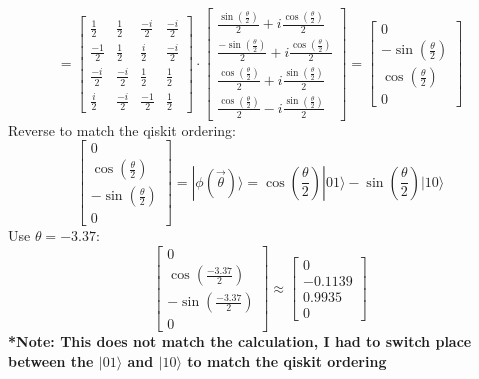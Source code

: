 \documentclass{article}
\begin{document}
\begin{equation}
	\label{eq:1}
	=
	\begin{bmatrix}
		\frac{1}{2}  & \frac{1}{2}  & \frac{-i}{2} & \frac{-i}{2} \\
		\frac{-1}{2} & \frac{1}{2}  & \frac{i}{2}  & \frac{-i}{2} \\
		\frac{-i}{2} & \frac{-i}{2} & \frac{1}{2}  & \frac{1}{2}  \\
		\frac{i}{2}  & \frac{-i}{2} & \frac{-1}{2} & \frac{1}{2}
	\end{bmatrix}
	\cdot
	\begin{bmatrix}
		\frac{\sin \left(\frac{\theta}{2}\right)}{2} + i \frac{\cos \left(\frac{\theta}{2}\right)}{2}  \\
		\frac{-\sin \left(\frac{\theta}{2}\right)}{2} + i \frac{\cos \left(\frac{\theta}{2}\right)}{2} \\
		\frac{\cos \left(\frac{\theta}{2}\right)}{2} + i \frac{\sin \left(\frac{\theta}{2}\right)}{2}  \\
		\frac{\cos \left(\frac{\theta}{2}\right)}{2} - i \frac{\sin \left(\frac{\theta}{2}\right)}{2}
	\end{bmatrix}
	=\begin{bmatrix}
		0                        \\
		- \sin(\frac{\theta}{2}) \\
		\cos(\frac{\theta}{2})   \\
		0
	\end{bmatrix}
\end{equation}
Reverse to match the qiskit ordering:
\begin{equation}
	\label{eq:ansatz}
	\begin{bmatrix}
		0                        \\
		\cos(\frac{\theta}{2})   \\
		- \sin(\frac{\theta}{2}) \\
		0
	\end{bmatrix}
	= |\phi(\vec{\theta}) \rangle = \cos\left(\frac{\theta}{2}\right) |01\rangle - \sin\left(\frac{\theta}{2}\right) |10\rangle
\end{equation}
Use \(\theta = -3.37\):
\begin{equation*}
	\begin{bmatrix}
		0                       \\
		\cos(\frac{-3.37}{2})   \\
		- \sin(\frac{-3.37}{2}) \\
		0
	\end{bmatrix}
	\approx
	\begin{bmatrix}
		0       \\
		-0.1139 \\
		0.9935  \\
		0
	\end{bmatrix}
\end{equation*}
\textbf{*Note: This does not match the calculation, I had to switch place between the \(|01\rangle\) and \(|10\rangle\) to match the qiskit ordering}
\end{document}

